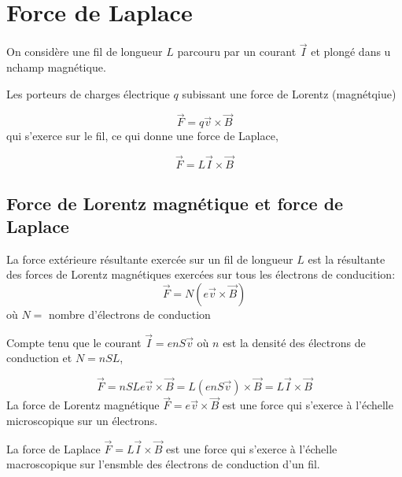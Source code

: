 \documentclass[
    11pt,
    a4paper,
    oneside,
    headinlcude, footinclude,
    twoside,
]{report}
\renewcommand{\vec}[1]{\overrightarrow{#1}}
\begin{document}
\section{Force de Laplace}
\label{sec:force_de_laplace}

On considère une fil de longueur $L$ parcouru par un courant $\vec I$ et plongé
dans u nchamp magnétique.

Les porteurs de charges électrique $q$ subissant une force de Lorentz
(magnétqiue)

$$\vec F = q \vec v \times \vec B$$ qui s'exerce sur le fil, ce qui donne une
force de Laplace,

\begin{equation}
    \label{eq:9.8} 
    \vec F = L \vec I \times \vec B
\end{equation}
\begin{center}
\end{center}

\subsection{Force de Lorentz magnétique et force de Laplace}
\label{sub:force_de_lorentz_magnetique_et_force_de_laplace}

La force extérieure résultante exercée sur un fil de longueur $L$ est la
résultante des forces de Lorentz magnétiques exercées sur tous les électrons de
conducition:
$$\vec F = N (e \vec v \times \vec B)$$
où $N =$ nombre d'électrons de conduction

Compte tenu que le courant $ \vec I  = en S\vec v$ où $n$ est la densité des
électrons de conduction et $N = n SL$,

$$\vec F = n SL e \vec v \times \vec B = L (en S \vec v) \times \vec B = L \vec I
\times \vec B$$ La force de Lorentz magnétique $\vec F =  e\vec v \times \vec B$
est une force qui s'exerce à l'échelle microscopique sur un électrons.

La force de Laplace $\vec F = L \vec I \times \vec B$ est une force qui
s'exerce à l'échelle macroscopique sur l'ensmble des électrons de conduction
d'un fil.
\end{document}
